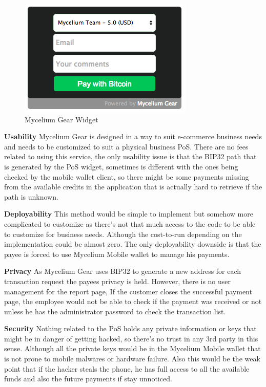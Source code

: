 \begin{figure}[htb!p]
\centering
\includegraphics[scale=0.5]{fig/Mycelium_gear.png}
  \caption{Mycelium Gear Widget}
\label{fig:mycelium-widget}
\end{figure}


\textbf{Usability}
Mycelium Gear is designed in a way to suit e-commerce business needs and needs to be customized to suit a physical business PoS. There are no fees related to using this service, the only usability issue is that the BIP32 path that is generated by the PoS widget, sometimes is different with the ones being checked by the mobile wallet client, so there might be some payments missing from the available credits in the application that is actually hard to retrieve if the path is unknown.

\textbf{Deployability}
This method would be simple to implement but somehow more complicated to customize as there's not that much access to the code to be able to customize for business needs. Although the cost-to-run depending on the implementation could be almost zero. The only deployability downside is that the payee is forced to use Mycelium Mobile wallet to manage his payments.

 \textbf{Privacy}
As Mycelium Gear uses BIP32 to generate a new address for each transaction request the payees privacy is held. However, there is no user management for the report page, If the customer closes the successful payment page, the employee would not be able to check if the payment was received or not unless he has the administrator password to check the transaction list.

 \textbf{Security}
Nothing related to the PoS holds any private information or keys that might be in danger of getting hacked, so there's no trust in any 3rd party in this sense. Although all the private keys would be in the Mycelium Mobile wallet that is not prone to mobile malwares or hardware failure. Also this would be the weak point that if the hacker steals the phone, he has full access to all the available funds and also the future payments if stay unnoticed.


